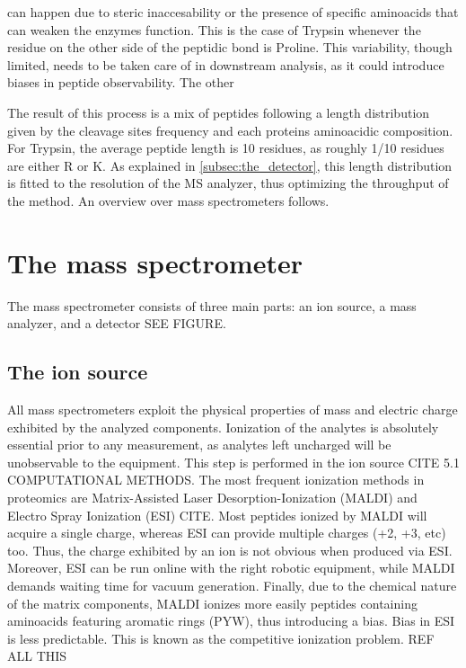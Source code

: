 \documentclass[11pt, a4paper]{report}
\begin{document}
 can happen due to steric inaccesability or the presence of specific aminoacids that can weaken the enzyme\textquotesingle s function. This is the case of Trypsin whenever the residue on the other side of the peptidic bond is Proline. This variability, though limited, needs to be taken care of in downstream analysis, as it could introduce biases in peptide observability. The other 

The result of this process is a mix of peptides following a length distribution given by the cleavage sites frequency and each protein\textquotesingle s aminoacidic composition. For Trypsin, the average peptide length is 10 residues, as roughly 1/10 residues are either R or K.
As explained in \ref{subsec:the_detector}, this length distribution is fitted to the resolution of the MS analyzer, thus optimizing the throughput of the method. An overview over mass spectrometers follows.

\section{The mass spectrometer}
\label{sec:thee_mass_spectrometer}

The mass spectrometer consists of three main parts: an ion source, a mass analyzer, and a detector SEE FIGURE.

\subsection{The ion source}
\label{subsec:the_ion_source}

All mass spectrometers exploit the physical properties of mass and electric charge exhibited by the analyzed components. Ionization of the analytes is absolutely essential prior to any measurement, as analytes left uncharged will be unobservable to the equipment.
This step is performed in the ion source CITE 5.1 COMPUTATIONAL METHODS. The most frequent ionization methods in proteomics are Matrix-Assisted Laser Desorption-Ionization (MALDI) and Electro Spray Ionization (ESI) CITE. Most peptides ionized by MALDI will acquire a single charge, whereas ESI can provide multiple charges (+2, +3, etc) too. Thus, the charge exhibited by an ion is not obvious when produced via ESI. Moreover, ESI can be run online with the right robotic equipment, while MALDI demands waiting time for vacuum generation. Finally, due to the chemical nature of the matrix components, MALDI ionizes more easily peptides containing aminoacids featuring aromatic rings (PYW), thus introducing a bias. Bias in ESI is less predictable. This is known as the competitive ionization problem. REF ALL THIS
\end{document}
